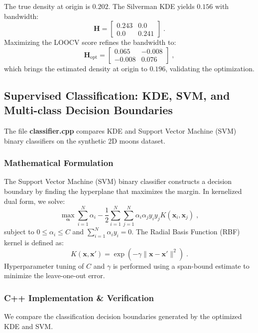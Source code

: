\documentclass{ol-softwaremanual}
\begin{document}
The true density at origin is $0.202$. The Silverman KDE yields $0.156$ with bandwidth:
\begin{equation}
    \mathbf{H} = \begin{bmatrix} 0.243 & 0.0 \\ 0.0 & 0.241 \end{bmatrix} \;.
\end{equation}
Maximizing the LOOCV score refines the bandwidth to:
\begin{equation}
    \mathbf{H}_{\text{opt}} = \begin{bmatrix} 0.065 & -0.008 \\ -0.008 & 0.076 \end{bmatrix} \;,
\end{equation}
which brings the estimated density at origin to $0.196$, validating the optimization.

\subsection{Supervised Classification: KDE, SVM, and Multi-class Decision Boundaries}
The file \textbf{classifier.cpp} compares KDE and Support Vector Machine (SVM) binary classifiers on the synthetic 2D moons dataset. 

\subsubsection{Mathematical Formulation}
The Support Vector Machine (SVM) binary classifier constructs a decision boundary by finding the hyperplane that maximizes the margin. In kernelized dual form, we solve:
\begin{equation}
    \max_{\boldsymbol{\alpha}} \sum_{i=1}^N \alpha_i - \frac{1}{2} \sum_{i=1}^N \sum_{j=1}^N \alpha_i \alpha_j y_i y_j K(\mathbf{x}_i, \mathbf{x}_j) \;,
\end{equation}
subject to $0 \le \alpha_i \le C$ and $\sum_{i=1}^N \alpha_i y_i = 0$.
The Radial Basis Function (RBF) kernel is defined as:
\begin{equation}
    K(\mathbf{x}, \mathbf{x}') = \exp\left( - \gamma \|\mathbf{x} - \mathbf{x}'\|^2 \right) \;.
\end{equation}
Hyperparameter tuning of $C$ and $\gamma$ is performed using a span-bound estimate to minimize the leave-one-out error.

\subsubsection{C++ Implementation \& Verification}
We compare the classification decision boundaries generated by the optimized KDE and SVM.
\end{document}
